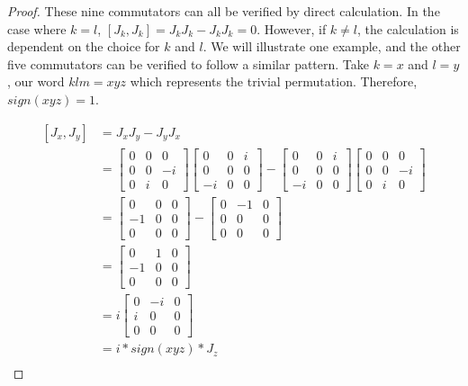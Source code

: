 \documentclass[10pt]{ucthesis}
\begin{document}
\noindent\begin{proof} These nine commutators can all be verified by direct calculation. In the case where $k=l$, $[J_k,J_k] = J_kJ_k - J_kJ_k = 0$. However, if $k\neq l$, the calculation is dependent on the choice for $k$ and $l$. We will illustrate one example, and the other five commutators can be verified to follow a similar pattern. Take $k=x$ and $l=y$, our word $klm=xyz$ which represents the trivial permutation. Therefore, $sign(xyz)=1$.

\begin{equation}
	\begin{aligned}
		[J_x,J_y] &= J_xJ_y - J_yJ_x \\
					&= \begin{bmatrix}
							0 & 0 & 0\\
							0 & 0 & -i\\
							0 & i & 0
						\end{bmatrix}
						 \begin{bmatrix}
							0 & 0 & i\\
							0 & 0 & 0\\
							-i & 0 & 0
						\end{bmatrix}
						-
						\begin{bmatrix}
							0 & 0 & i\\
							0 & 0 & 0\\
							-i & 0 & 0
						\end{bmatrix}
						 \begin{bmatrix}
							0 & 0 & 0\\
							0 & 0 & -i\\
							0 & i & 0
						\end{bmatrix}\\
					&=  \begin{bmatrix}
							0 & 0 & 0\\
							-1 & 0 & 0\\
							0 & 0 & 0
						\end{bmatrix}
						-
						 \begin{bmatrix}
							0 & -1 & 0\\
							0 & 0 & 0\\
							0 & 0 & 0
						\end{bmatrix} \\
					&= \begin{bmatrix}
							0 & 1 & 0\\
							-1 & 0 & 0\\
							0 & 0 & 0
						\end{bmatrix} \\
					&=i \begin{bmatrix}
							0 & -i & 0\\
							i & 0 & 0\\
							0 & 0 & 0
						\end{bmatrix} \\
					&= i*sign(xyz)*J_z\\
	\end{aligned}
\end{equation} 


\end{proof}
\end{document}
